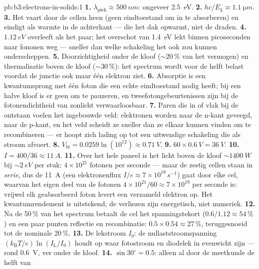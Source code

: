 \begin{solution}{pb:b3:electrons-in-solids:1}
\textbf{1.} $\lambda_{\text{piek}} \approx \qty{500}{nm}$:
ongeveer \qty{2.5}{eV}.
\textbf{2.} $hc/E_{\text{g}} \approx \qty{1.1}{\micro m}$.
\textbf{3.} Het vaart door de cellen heen (geen eindtoestand om in te
absorberen) en eindigt als warmte in de achterkant --- die het dak opwarmt, niet
de draden.
\textbf{4.} $\qty{1.12}{eV}$ overleeft als het paar; het overschot van
\qty{1.4}{eV} lekt binnen picoseconden naar fononen weg --- sneller
dan welke schakeling het ook zou kunnen onderscheppen.
\textbf{5.} Doorzichtigheid onder de kloof ($\sim20\,\%$ van het vermogen) en
thermalisatie boven de kloof ($\sim30\,\%$): het spectrum wordt voor de
helft belast voordat de junctie ook maar één elektron ziet.
\textbf{6.} Absorptie is een kwantumsprong met één foton die een
echte eindtoestand nodig heeft; bij een halve kloof is er geen om te pauzeren, en
tweefotongebeurtenissen zijn bij de fotonendichtheid van zonlicht verwaarloosbaar.
\textbf{7.} Paren die in of vlak bij de  ontstaan voelen het
ingebouwde veld: elektronen worden naar de n-kant geveegd,  naar de
p-kant, en het veld scheidt ze sneller dan ze elkaar kunnen vinden
om te recombineren --- er hoopt zich lading op tot een uitwendige
schakeling die als stroom afvoert.
\textbf{8.} $V_{\text{bi}} = 0.0259\ln(10^{12}) \approx
\qty{0.71}{V}$.
\textbf{9.} $60\times\qty{0.6}{V} = \qty{36}{V}$.
\textbf{10.} $I = 400/36 \approx \qty{11}{A}$.
\textbf{11.} Over het hele paneel is het licht boven de kloof
$\sim\qty{1400}{W}$ bij $\sim\qty{2}{eV}$ per stuk: $4\times10^{21}$
fotonen per seconde --- maar de zestig cellen staan in \emph{serie},
dus de \qty{11}{A} (een elektronenflux $I/e \approx
7\times10^{19}\,\unit{s^{-1}}$) gaat door elke cel, waarvan het
eigen deel van de fotonen $4\times10^{21}/60 \approx
7\times10^{19}$ per seconde is: vrijwel elk geabsorbeerd foton levert
een verzameld elektron op. Het kwantumrendement is uitstekend; de
verliezen zijn energetisch, niet numeriek.
\textbf{12.} Na de 50\,\% van het spectrum betaalt de cel het
spanningstekort ($0.6/1.12 \approx 54\,\%$) en een paar punten
reflectie en recombinatie: $0.5\times0.54 \approx 27\,\%$,
teruggesnoeid tot de nominale 20\,\%.
\textbf{13.} De lekstroom $I_0$: de nullaststroomspanning
$(k_{\text{B}}T/e)\ln(I_{\text{L}}/I_0)$ houdt op waar
fotostroom en diodelek in evenwicht zijn --- rond \qty{0.6}{V}, ver
onder de kloof.
\textbf{14.} $\sin30^\circ = 0.5$: alleen al door de meetkunde de helft van

\end{solution}
